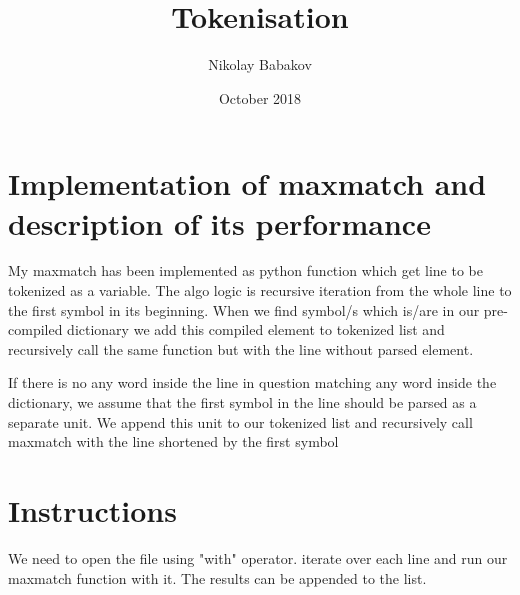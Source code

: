 \documentclass{article}
\title{Tokenisation}
\author{Nikolay Babakov }
\date{October 2018}
\begin{document}
\maketitle

\section{Implementation of maxmatch and description of its performance}
My maxmatch has been implemented as python function which get line to be tokenized as a variable. The algo logic is recursive iteration from the whole line to the first symbol in its beginning. When we find symbol/s which is/are in our pre-compiled dictionary we add this compiled element to tokenized list and recursively call the same function but with the line without parsed element. \newline

If there is no any word inside the line in question matching any word inside the dictionary, we assume that the first symbol in the line should be parsed as a separate unit. We append this unit to our tokenized list and recursively call maxmatch with the line shortened by the first symbol

\section{Instructions }
We need to open the file using "with" operator. iterate over each line and run our maxmatch function with it. The results can be appended to the list.
\end{document}
